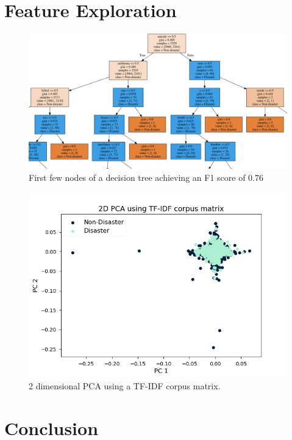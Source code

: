 \documentclass[journal, ]{IEEEtran}
\let\MYoriglatexcaption\caption
\renewcommand{\caption}[2][\relax]{\MYoriglatexcaption[#2]{#2}}
\begin{document}
\section{Feature Exploration}
\begin{figure}[hbt!]
  \centering
  \includegraphics[width=\linewidth]{../figures/decision_tree.png}
  \caption{First few nodes of a decision tree achieving an F1 score of 0.76}
  \label{fig:decision_tree}
\end{figure}

\begin{figure}[hbt!]
  \centering
  \includegraphics[width=\linewidth]{../figures/pca.png}
  \caption{2 dimensional PCA using a TF-IDF corpus matrix.}
  \label{fig:pca}
\end{figure}

\section{Conclusion}
\end{document}
